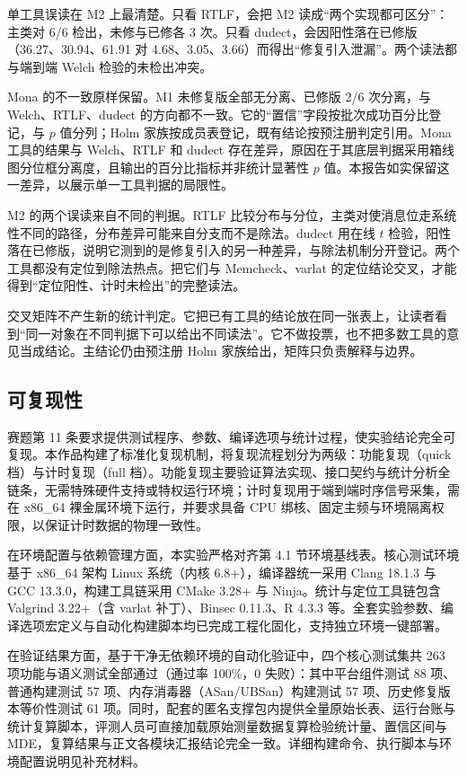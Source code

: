 单工具误读在 M2 上最清楚。只看 RTLF，会把 M2 读成“两个实现都可区分”：主类对 6/6 检出，未修与已修各 3 次。只看 dudect，会因阳性落在已修版（36.27、30.94、61.91 对 4.68、3.05、3.66）而得出“修复引入泄漏”。两个读法都与端到端 Welch 检验的未检出冲突。\cite{dudect}

Mona 的不一致原样保留。M1 未修复版全部无分离、已修版 2/6 次分离，与 Welch、RTLF、dudect 的方向都不一致。它的“置信”字段按批次成功百分比登记，与 $p$ 值分列；Holm 家族按成员表登记，既有结论按预注册判定引用。Mona 工具的结果与 Welch、RTLF 和 dudect 存在差异，原因在于其底层判据采用箱线图分位框分离度，且输出的百分比指标并非统计显著性 $p$ 值。本报告如实保留这一差异，以展示单一工具判据的局限性。

M2 的两个误读来自不同的判据。RTLF 比较分布与分位，主类对使消息位走系统性不同的路径，分布差异可能来自分支而不是除法。dudect 用在线 $t$ 检验，阳性落在已修版，说明它测到的是修复引入的另一种差异，与除法机制分开登记。两个工具都没有定位到除法热点。把它们与 Memcheck、varlat 的定位结论交叉，才能得到“定位阳性、计时未检出”的完整读法。





交叉矩阵不产生新的统计判定。它把已有工具的结论放在同一张表上，让读者看到“同一对象在不同判据下可以给出不同读法”。它不做投票，也不把多数工具的意见当成结论。主结论仍由预注册 Holm 家族给出，矩阵只负责解释与边界。

\subsection{可复现性}

赛题第 11 条要求提供测试程序、参数、编译选项与统计过程，使实验结论完全可复现。本作品构建了标准化复现机制，将复现流程划分为两级：功能复现（quick 档）与计时复现（full 档）。功能复现主要验证算法实现、接口契约与统计分析全链条，无需特殊硬件支持或特权运行环境；计时复现用于端到端时序信号采集，需在 x86\_64 裸金属环境下运行，并要求具备 CPU 绑核、固定主频与环境隔离权限，以保证计时数据的物理一致性。

在环境配置与依赖管理方面，本实验严格对齐第 4.1 节环境基线表。核心测试环境基于 x86\_64 架构 Linux 系统（内核 6.8+），编译器统一采用 Clang 18.1.3 与 GCC 13.3.0，构建工具链采用 CMake 3.28+ 与 Ninja。统计与定位工具链包含 Valgrind 3.22+（含 varlat 补丁）、Binsec 0.11.3、R 4.3.3 等。全套实验参数、编译选项宏定义与自动化构建脚本均已完成工程化固化，支持独立环境一键部署。

在验证结果方面，基于干净无依赖环境的自动化验证中，四个核心测试集共 263 项功能与语义测试全部通过（通过率 100\%，0 失败）：其中平台组件测试 88 项、普通构建测试 57 项、内存消毒器（ASan/UBSan）构建测试 57 项、历史修复版本等价性测试 61 项。同时，配套的匿名支撑包内提供全量原始长表、运行台账与统计复算脚本，评测人员可直接加载原始测量数据复算检验统计量、置信区间与 MDE，复算结果与正文各模块汇报结论完全一致。详细构建命令、执行脚本与环境配置说明见补充材料。

